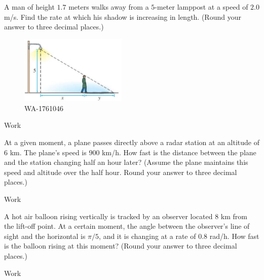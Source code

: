 \documentclass[12pt,addpoints, answers, fleqn]{exam}
\begin{document}
\begin{teacher}
\begin{questions}
\question 	%

A man of height $1.7$ meters walks away from a $5$-meter lamppost at a speed of $2.0$ m/s. Find the rate at which his shadow is increasing in length. (Round your answer to three decimal places.)

\begin{figure}[htbp] %
   \centering
   \includegraphics[width=2in]{./graphics/1761046.pdf} 
   \caption{WA-1761046}
   \label{fig:1761046}
\end{figure}
\begin{solution}
Work
\end{solution}

\question 	%

At a given moment, a plane passes directly above a radar station at an altitude of $6$ km. The plane's speed is $900$ km/h. How fast is the distance between the plane and the station changing half an hour later? (Assume the plane maintains this speed and altitude over the half hour. Round your answer to three decimal places.)
 \begin{solution}
Work
\end{solution}

\question 	%

A hot air balloon rising vertically is tracked by an observer located $8$ km from the lift-off point. At a certain moment, the angle between the observer's line of sight and the horizontal is $\pi /5$, and it is changing at a rate of $0.8$ rad/h. How fast is the balloon rising at this moment? (Round your answer to three decimal places.)
\begin{solution}
Work
\end{solution}
 
\end{questions}
\end{teacher}

\vfill
\pagebreak

\end{document}
